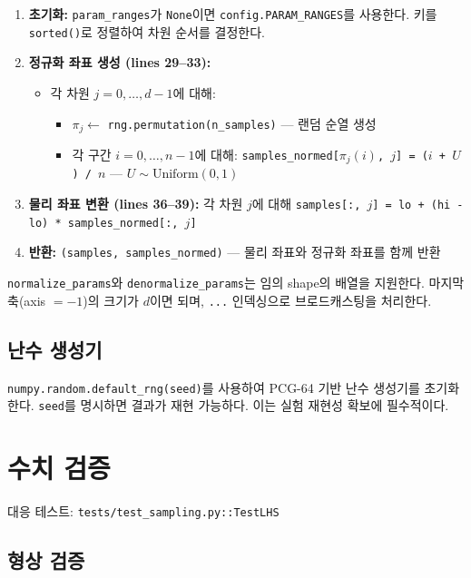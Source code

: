 \documentclass[11pt]{article}
\begin{document}
\begin{enumerate}[nosep]
  \item \textbf{초기화:}
    \texttt{param\_ranges}가 \texttt{None}이면 \texttt{config.PARAM\_RANGES}를 사용한다.
    키를 \texttt{sorted()}로 정렬하여 차원 순서를 결정한다.
  \item \textbf{정규화 좌표 생성 (lines 29--33):}
    \begin{itemize}[nosep]
      \item 각 차원 $j = 0, \dots, d-1$에 대해:
        \begin{itemize}[nosep]
          \item $\pi_j \leftarrow$ \texttt{rng.permutation(n\_samples)} --- 랜덤 순열 생성
          \item 각 구간 $i = 0, \dots, n-1$에 대해:
            \texttt{samples\_normed[$\pi_j(i)$, $j$] = ($i$ + $U$) / $n$} --- $U \sim \mathrm{Uniform}(0,1)$
        \end{itemize}
    \end{itemize}
  \item \textbf{물리 좌표 변환 (lines 36--39):}
    각 차원 $j$에 대해 \texttt{samples[:, $j$] = lo + (hi - lo) * samples\_normed[:, $j$]}
  \item \textbf{반환:}
    \texttt{(samples, samples\_normed)} --- 물리 좌표와 정규화 좌표를 함께 반환
\end{enumerate}

\texttt{normalize\_params}와 \texttt{denormalize\_params}는 임의 shape의 배열을 지원한다.
마지막 축(axis $= -1$)의 크기가 $d$이면 되며,
\texttt{...} 인덱싱으로 브로드캐스팅을 처리한다.

\subsection{난수 생성기}

\texttt{numpy.random.default\_rng(seed)}를 사용하여 PCG-64 기반 난수 생성기를 초기화한다.
\texttt{seed}를 명시하면 결과가 재현 가능하다.
이는 실험 재현성 확보에 필수적이다.


\section{수치 검증}

대응 테스트: \texttt{tests/test\_sampling.py::TestLHS}

\subsection{형상 검증}
\end{document}
